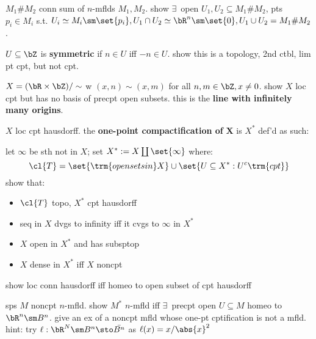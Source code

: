\begin{exr}[source=Primary Source Material]
    $M_{1}\#M_{2}$ conn sum of $n$-mflds $M_{1},M_{2}$.
    show $\exists \, $ open $U_{1},U_{2}\subseteq M_{1}\#M_{2}$,
    pts $p_{i}\in M_{i}$ s.t. $U_{i}\simeq M_{i}\sm\set{p_{i}},
    U_{1}\cap U_{2}\simeq\bR^{n}\sm\set{0},U_{1}\cup U_{2}=M_{1}\#M_{2}$.
\end{exr}

\begin{exr}[source=Primary Source Material]
    $U\subseteq \bZ$ is \textbf{symmetric} if $n\in U$ iff $-n\in U$.
    show this is a topology, 2nd ctbl, lim pt cpt, but not cpt.
\end{exr}

\begin{exr}[source=Primary Source Material]
    $X=(\bR\times\bZ)/\sim$ w $(x,n)\sim(x,m)$ for all $n,m \in\bZ,x\neq0$.
    show $X$ loc cpt but has no basis of precpt open subsets.
    this is the \textbf{line with infinitely many origins}.
\end{exr}

\begin{exr}[source=Primary Source Material]
    $X$ loc cpt hausdorff.
    the \textbf{one-point compactification of} $\bm{X}$ is $X^{*}$ def'd as such:

    let $\infty$ be sth not in $X$; set $X^{*}:=X\coprod\set{\infty}$ where:
    \begin{equation*}
        \cl{T}=\set{\trm{open sets in }X}\cup
        \set{U\subseteq X^{*}:U^{c} \trm{ cpt}}
    \end{equation*}
    show that: \vspace{-0.2in}
    \begin{itemize}
        \item $\cl{T}$ topo, $X^{*}$ cpt hausdorff
        \item seq in $X$ dvgs to infinity iff it cvgs to $\infty$ in $X^{*}$
        \item $X$ open in $X^{*}$ and has subsptop
        \item $X$ dense in $X^{*}$ iff $X$ noncpt
    \end{itemize}
\end{exr}

\begin{exr}[source=Primary Source Material]
    show loc conn hausdorff iff homeo to open subset of cpt hausdorff
\end{exr}

\begin{exr}[source=Primary Source Material]
    sps $M$ noncpt $n$-mfld.
    show $M^{*}$ $n$-mfld iff $\exists \, $ precpt open $U\subseteq M$ homeo to
    $\bR^{n}\sm B^{n}$.
    give an ex of a noncpt mfld whose one-pt cptification is not a mfld.
    hint: try $\ell:\bR^{N}\sm B^{n}\sto\bar{B^{n}}$ as $\ell(x)=x/\abs{x}^{2}$
\end{exr}

